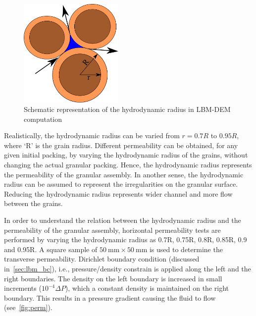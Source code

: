 \begin{figure}[htpb]
\centering
\includegraphics[width=0.45\textwidth]{reduction}
\caption{Schematic representation of the hydrodynamic radius in LBM-DEM 
computation}
\label{fig:reduction}
\end{figure}

Realistically, the hydrodynamic radius can be varied from $ r = 0.7 R$ to 
$0.95R$, where ‘R’ is the grain radius. Different permeability can be 
obtained, for any given initial packing, by varying the hydrodynamic radius of 
the grains, without changing the actual granular packing. Hence, the 
hydrodynamic radius represents the permeability of the granular assembly. In 
another sense, the hydrodynamic radius can be assumed to represent the 
irregularities on the granular surface. Reducing the hydrodynamic radius 
represents wider channel and more flow between the grains. 

In order to understand the relation between the hydrodynamic radius and the 
permeability of the granular assembly, horizontal permeability tests are 
performed by varying the hydrodynamic radius as 0.7R, 0.75R, 0.8R, 0.85R, 0.9 
and 0.95R. A square sample of $50~\si{\mm} \times 50~\si{\mm}$ is used to 
determine the transverse permeability. Dirichlet boundary condition (discussed 
in~\cref{sec:lbm_bc}), i.e.,  pressure/density constrain is applied along the 
left and the right boundaries. The density on the left boundary is increased in 
small increments ($10^{-4} \Delta P$), which a constant density is maintained 
on the right boundary. This results in a pressure gradient causing the fluid to 
flow (see~\cref{fig:perm}). 

